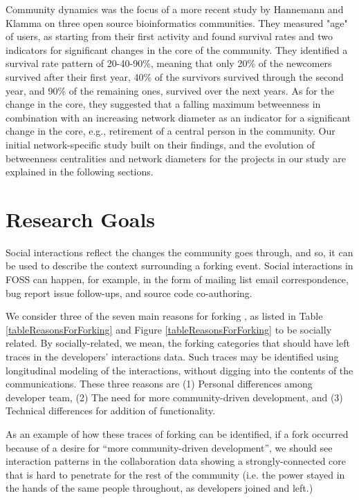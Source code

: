 \documentclass[11pt]{report}
\begin{document}
Community dynamics was the focus of a more recent study by Hannemann and Klamma \cite{Hannemann} on three open source bioinformatics communities. They measured "age" of users, as starting from their first activity and found survival rates and two indicators for significant changes in the core of the community. They identified a survival rate pattern of 20-40-90\%, meaning that only 20\% of the newcomers survived after their first year, 40\% of the survivors survived through the second year, and 90\% of the remaining ones, survived over the next years. As for the change in the core, they suggested that a falling maximum betweenness in combination with an increasing network diameter as an indicator for a significant change in the core, e.g., retirement of a central person in the community. Our initial network-specific study built on their findings, and the evolution of betweenness centralities and network diameters for the projects in our study are explained in the following sections.
\pagebreak

\section{Research Goals}
\label{ResearchGoals}

Social interactions reflect the changes the community goes through, and so, it can be used to describe the context surrounding a forking event. Social interactions in FOSS can happen, for example, in the form of mailing list email correspondence, bug report issue follow-ups, and source code co-authoring. 

We consider three of the seven main reasons for forking \cite{Robles}, as listed in Table \ref{tableReasonsForForking} and Figure \ref{tableReasonsForForking} to be socially related. By socially-related, we mean, the forking categories that should have left traces in the developers' interactions data. Such traces may be identified using longitudinal modeling of the interactions, without digging into the contents of the communications. These three reasons are (1) Personal differences among developer team, (2) The need for more community-driven development, and (3) Technical differences for addition of functionality. 


As an example of how these traces of forking can be identified, if a fork occurred because of a desire for ``more community-driven development'', we should see interaction patterns in the collaboration data showing a strongly-connected core that is hard to penetrate for the rest of the community (i.e. the power stayed in the hands of the same people throughout, as developers joined and left.) \\
\end{document}
